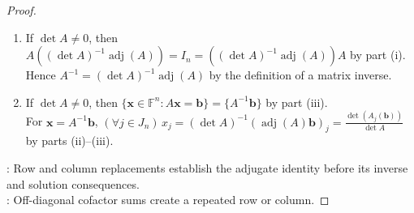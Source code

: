 \begin{theorem}
\begin{proof}
\begin{enumerate}[label=(\roman*)]
$\sum\limits_{i=1}^{n}C_{ij}(A)b_i=\sum\limits_{i=1}^{n}C_{ij}(A_j(\mathbf{b}))b_i=\det(A_j(\mathbf{b}))$ by the preceding cofactor identity and Lemma \ref{lem:cofactor-expansion}(ii).
\item If $\det A\neq0$, then $A((\det A)^{-1}\operatorname{adj}(A))=I_n=((\det A)^{-1}\operatorname{adj}(A))A$ by part (i).\\
Hence $A^{-1}=(\det A)^{-1}\operatorname{adj}(A)$ by the definition of a matrix inverse.
\item If $\det A\neq0$, then $\{\mathbf{x}\in\mathbb{F}^n:A\mathbf{x}=\mathbf{b}\}=\{A^{-1}\mathbf{b}\}$ by part (iii).\\
For $\mathbf{x}=A^{-1}\mathbf{b}$, $(\forall j\in J_n)\,x_j=(\det A)^{-1}(\operatorname{adj}(A)\mathbf{b})_j=\frac{\det(A_j(\mathbf{b}))}{\det A}$ by parts (ii)--(iii).
\end{enumerate}
: Row and column replacements establish the adjugate identity before its inverse and solution consequences.\\
: Off-diagonal cofactor sums create a repeated row or column.
\end{proof}
\end{theorem}

